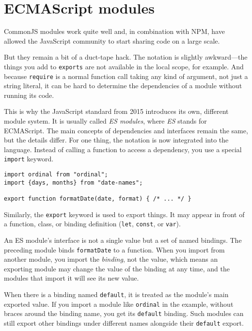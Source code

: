 \section{ECMAScript modules}

CommonJS modules work quite well and, in combination with NPM, have allowed the JavaScript community to start sharing code on a large scale.

But they remain a bit of a duct-tape hack. The notation is slightly awkward—the things you add to \lstinline`exports` are not available in the local scope, for example. And because \lstinline`require` is a normal function call taking any kind of argument, not just a string literal, it can be hard to determine the dependencies of a module without running its code.

\label{modules.es}This is why the JavaScript standard from 2015 introduces its own, different module system. It is usually called \emph{ES modules}, where \emph{ES} stands for ECMAScript. The main concepts of dependencies and interfaces remain the same, but the details differ. For one thing, the notation is now integrated into the language. Instead of calling a function to access a dependency, you use a special \lstinline`import` keyword.

\begin{lstlisting}
import ordinal from "ordinal";
import {days, months} from "date-names";

export function formatDate(date, format) { /* ... */ }
\end{lstlisting}
\noindent{}

Similarly, the \lstinline`export` keyword is used to export things. It may appear in front of a function, class, or binding definition (\lstinline`let`, \lstinline`const`, or \lstinline`var`).

An ES module's interface is not a single value but a set of named bindings. The preceding module binds \lstinline`formatDate` to a function. When you import from another module, you import the \emph{binding}, not the value, which means an exporting module may change the value of the binding at any time, and the modules that import it will see its new value.

When there is a binding named \lstinline`default`, it is treated as the module's main exported value. If you import a module like \lstinline`ordinal` in the example, without braces around the binding name, you get its \lstinline`default` binding. Such modules can still export other bindings under different names alongside their \lstinline`default` export.

